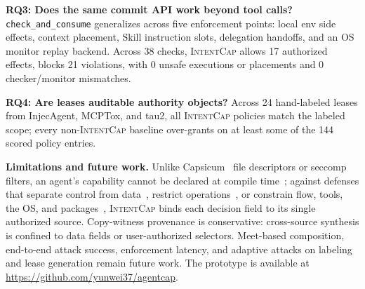 \documentclass[sigconf,nonacm]{acmart}
\newcommand{\sys}{\textsc{IntentCap}\xspace}
\begin{document}
\textbf{RQ3: Does the same commit API work beyond tool calls?}
\texttt{check\_and\_consume} generalizes across five enforcement points: local env side effects, context placement, Skill instruction slots, delegation handoffs, and an OS monitor replay backend.
Across 38 checks, \sys allows 17 authorized effects, blocks 21 violations, with 0 unsafe executions or placements and 0 checker/monitor mismatches.

\textbf{RQ4: Are leases auditable authority objects?}
Across 24 hand-labeled leases from InjecAgent, MCPTox, and tau2, all \sys policies match the labeled scope; every non-\sys baseline over-grants on at least some of the 144 scored policy entries.

\textbf{Limitations and future work.}
Unlike Capsicum~\cite{capsicum} file descriptors or seccomp filters, an agent's capability cannot be declared at compile time~\cite{dennis-vanhorn,saltzer-schroeder,denning-lattice,confused-deputy}; against defenses that separate control from data~\cite{camel}, restrict operations~\cite{progent,isolategpt}, or constrain flow, tools, the OS, and packages~\cite{fides,eim-bpftime,actplane,skillguard}, \sys binds each decision field to its single authorized source.
Copy-witness provenance is conservative: cross-source synthesis is confined to data fields or user-authorized selectors.
Meet-based composition, end-to-end attack success, enforcement latency, and adaptive attacks on labeling and lease generation remain future work.
The prototype is available at \url{https://github.com/yunwei37/agentcap}.



\end{document}

